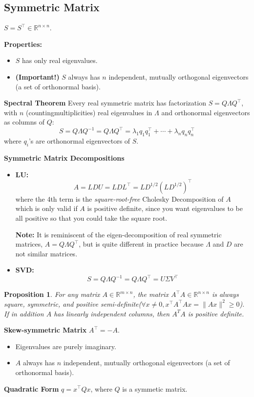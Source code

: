 \documentclass[13pt]{article}
\newtheorem{proposition}[theorem]{Proposition}
\theoremstyle{definition}
\theoremstyle{remark}
\begin{document}
\headrule

\begin{multicols}{2}
\section{Symmetric Matrix}
$S = S^\top \in \mathbb{R}^{n\times n}$.

\textbf{Properties:}
\begin{itemize}
    \item $S$ has only real eigenvalues.
    \item \textbf{(Important!)} $S$ always has $n$ independent, mutually orthogonal eigenvectors (a set of orthonormal basis).
\end{itemize}
\textbf{Spectral Theorem}
Every real symmetric matrix has factorization $S = Q\Lambda Q^\top$, with $n$ (countingmultiplicities) real eigenvalues in $\Lambda$ and orthonormal eigenvectors as columns of $Q$:
\[
S = Q\Lambda Q^{-1} = Q\Lambda Q^\top = \lambda_1 q_1 q_1^\top + \cdots + \lambda_n q_n q_n^\top
\]
where $q_i$'s are orthonormal eigenvectors of $S$.

\textbf{Symmetric Matrix Decompositions}
\begin{itemize}
    \item \textbf{LU:} 
    \[
    A=LDU=LD L^\top = LD^{1/2}(LD^{1/2})^\top
    \]
    where the 4th term is the \textit{square-root-free} Cholesky Decomposition of $A$ which is only valid if $A$ is positive definite, since you want eigenvalues to be all positive so that you could take the square root.

    \textbf{Note:} It is reminiscent of the eigen-decomposition of real symmetric matrices, $A = Q\Lambda Q^\top$, but is quite different in practice because $\Lambda$ and $D$ are not similar matrices.
    \item \textbf{SVD:} 
    \[
    S = Q\Lambda Q^{-1} = Q\Lambda Q^\top = U\Sigma V^\top
    \]
\end{itemize}

\begin{proposition}
    For any matrix $A\in \mathbb{R}^{m\times n}$, the matrix $A^\top A\in \mathbb{R}^{n\times n}$ is always square, symmetric, and positive semi-definite($\forall x\ne 0, x^\top A^\top Ax = \|Ax\|^2 \ge 0$). If in addition $A$ has linearly independent columns, then $A^{T} A$ is positive definite.
    
\end{proposition}
\textbf{Skew-symmetric Matrix}
$A^\top=-A$.
\begin{itemize}
    \item Eigenvalues are purely imaginary.
    \item $A$ always has $n$ independent, mutually orthogonal eigenvectors (a set of orthonormal basis).
\end{itemize}
\textbf{Quadratic Form}
$q = x^\top Q x$, where $Q$ is a symmetic matrix. 


\end{multicols}
\end{document}
